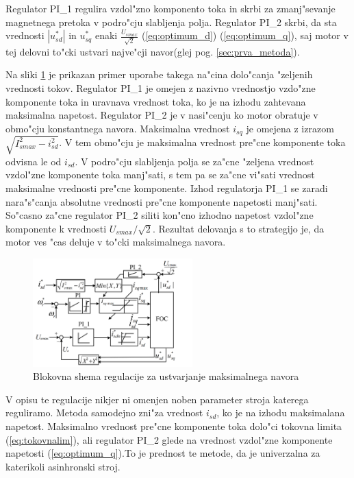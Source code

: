 \documentclass[journal,a4paper,twoside]{sty/IEEEtran}
\begin{document}
Regulator PI\_1 regulira vzdol"zno komponento toka in skrbi za zmanj"sevanje magnetnega pretoka v podro"cju slabljenja polja. Regulator PI\_2 skrbi, da sta vrednosti $|u_{sd}^*|$ in $u_{sq}^*$ enaki $\frac{U_{smax}}{\sqrt{2}}$ (\ref{eq:optimum_d}) (\ref{eq:optimum_q}), saj motor v tej delovni to"cki ustvari najve"cji navor(glej pog. \ref{sec:prva_metoda}).

Na sliki \ref{fig:MTPA_app} je prikazan primer uporabe takega na"cina dolo"canja "zeljenih vrednosti tokov. Regulator PI\_1 je omejen z nazivno vrednostjo vzdo"zne komponente toka in uravnava vrednost toka, ko je na izhodu zahtevana maksimalna napetost. Regulator PI\_2 je v nasi"cenju ko motor obratuje v obmo"cju konstantnega navora. Maksimalna vrednost $i_{sq}$ je omejena z izrazom $\sqrt{I_{smax}^2-i_{sd}^2}$. V tem obmo"cju je maksimalna vrednost pre"cne komponente toka odvisna le od $i_{sd}$. V podro"cju slabljenja polja se za"cne "zeljena vrednost vzdol"zne komponente toka manj"sati, s tem pa se za"cne vi"sati vrednost maksimalne vrednosti pre"cne komponente. Izhod regulatorja PI\_1 se zaradi nara"s"canja absolutne vrednosti pre"cne komponente napetosti manj"sati. So"casno za"cne regulator PI\_2 siliti kon"cno izhodno napetost vzdol"zne komponente k vrednosti $U_{smax}/\sqrt{2}$. Rezultat delovanja s to strategijo je, da motor ves "cas deluje v to"cki maksimalnega navora.~\cite{MTPA}



\begin{figure}
\includegraphics[width=0.55\textwidth]{MTPA.png}

\caption{Blokovna shema regulacije za ustvarjanje maksimalnega navora \cite{MTPA}}
\label{fig:MTPA_app}
\end{figure}

V opisu te regulacije nikjer ni omenjen noben parameter stroja katerega reguliramo. Metoda samodejno zni"za vrednost $i_{sd}$, ko je na izhodu maksimalana napetost. Maksimalno vrednost pre"cne komponente toka dolo"ci tokovna limita (\ref{eq:tokovnalim}), ali regulator PI\_2 glede na vrednost vzdol"zne komponente napetosti (\ref{eq:optimum_q}).To je prednost te metode, da je univerzalna za katerikoli asinhronski stroj.
\end{document}
